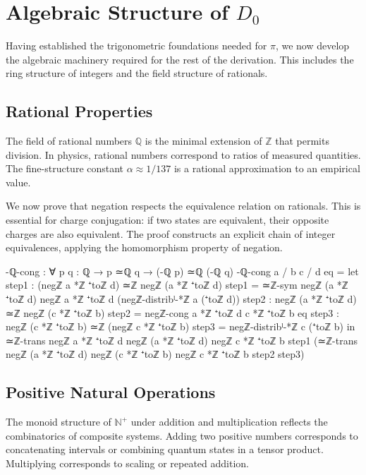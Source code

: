 \documentclass[11pt,a4paper]{book}
\begin{document}
\chapter{Algebraic Structure of $D_0$}
\label{chap:algebraic-structure}

Having established the trigonometric foundations needed for $\pi$, we now develop the algebraic machinery required for the rest of the derivation. This includes the ring structure of integers and the field structure of rationals.

\section{Rational Properties}

The field of rational numbers $\mathbb{Q}$ is the minimal extension of $\mathbb{Z}$ that permits division.
In physics, rational numbers correspond to ratios of measured quantities.
The fine-structure constant $\alpha \approx 1/137$ is a rational approximation to an empirical value.

We now prove that negation respects the equivalence relation on rationals.
This is essential for charge conjugation: if two states are equivalent, their opposite charges are also equivalent.
The proof constructs an explicit chain of integer equivalences, applying the homomorphism property of negation.

\begin{code}
-ℚ-cong : ∀ {p q : ℚ} → p ≃ℚ q → (-ℚ p) ≃ℚ (-ℚ q)
-ℚ-cong {a / b} {c / d} eq = 
  let step1 : (negℤ a *ℤ ⁺toℤ d) ≃ℤ negℤ (a *ℤ ⁺toℤ d)
      step1 = ≃ℤ-sym {negℤ (a *ℤ ⁺toℤ d)} {negℤ a *ℤ ⁺toℤ d} (negℤ-distribˡ-*ℤ a (⁺toℤ d))
      step2 : negℤ (a *ℤ ⁺toℤ d) ≃ℤ negℤ (c *ℤ ⁺toℤ b)
      step2 = negℤ-cong {a *ℤ ⁺toℤ d} {c *ℤ ⁺toℤ b} eq
      step3 : negℤ (c *ℤ ⁺toℤ b) ≃ℤ (negℤ c *ℤ ⁺toℤ b)
      step3 = negℤ-distribˡ-*ℤ c (⁺toℤ b)
  in ≃ℤ-trans {negℤ a *ℤ ⁺toℤ d} {negℤ (a *ℤ ⁺toℤ d)} {negℤ c *ℤ ⁺toℤ b}
       step1 (≃ℤ-trans {negℤ (a *ℤ ⁺toℤ d)} {negℤ (c *ℤ ⁺toℤ b)} {negℤ c *ℤ ⁺toℤ b} step2 step3)
\end{code}

\section{Positive Natural Operations}

The monoid structure of $\mathbb{N}^+$ under addition and multiplication reflects the combinatorics of composite systems.
Adding two positive numbers corresponds to concatenating intervals or combining quantum states in a tensor product.
Multiplying corresponds to scaling or repeated addition.
\end{document}
